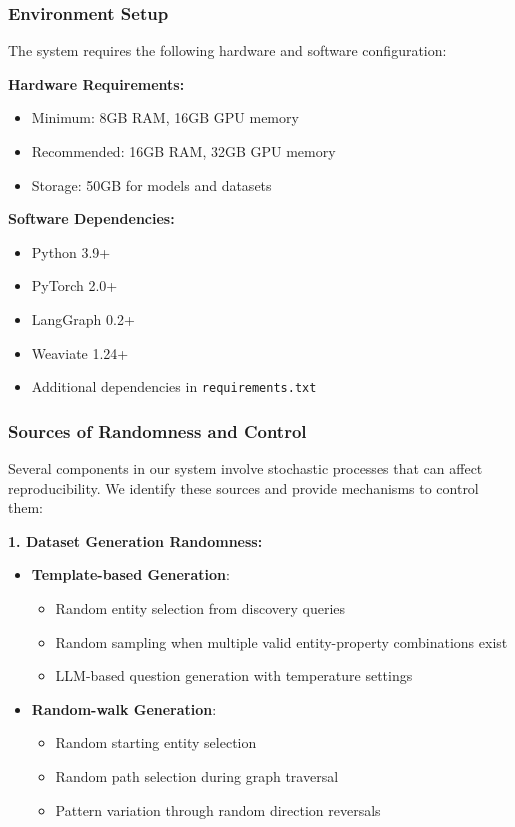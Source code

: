 \subsubsection{Environment Setup}
The system requires the following hardware and software configuration:

\textbf{Hardware Requirements:}
\begin{itemize}
    \item Minimum: 8GB RAM, 16GB GPU memory
    \item Recommended: 16GB RAM, 32GB GPU memory
    \item Storage: 50GB for models and datasets
\end{itemize}

\textbf{Software Dependencies:}
\begin{itemize}
    \item Python 3.9+
    \item PyTorch 2.0+
    \item LangGraph 0.2+
    \item Weaviate 1.24+
    \item Additional dependencies in \texttt{requirements.txt}
\end{itemize}

\subsubsection{Sources of Randomness and Control}
\label{subsubsec:randomness}

Several components in our system involve stochastic processes that can affect reproducibility. We identify these sources and provide mechanisms to control them:

\textbf{1. Dataset Generation Randomness:}
\begin{itemize}
    \item \textbf{Template-based Generation}: 
    \begin{itemize}
        \item Random entity selection from discovery queries
        \item Random sampling when multiple valid entity-property combinations exist
        \item LLM-based question generation with temperature settings
    \end{itemize}
    \item \textbf{Random-walk Generation}:
    \begin{itemize}
        \item Random starting entity selection
        \item Random path selection during graph traversal
        \item Pattern variation through random direction reversals
    \end{itemize}
\end{itemize}

